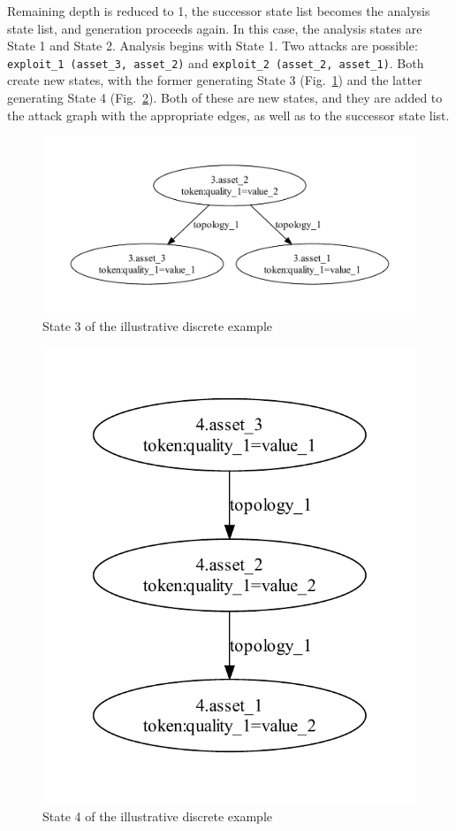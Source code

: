 Remaining depth is reduced to 1, the successor state list becomes the
analysis state list, and generation proceeds again. In this case, the
analysis states are State 1 and State 2. Analysis begins with State 1. 
Two attacks are possible: \texttt{exploit\_1 (asset\_3, asset\_2)} and
\texttt{exploit\_2 (asset\_2, asset\_1)}. Both create new states, with the
former generating State 3 (Fig.~\ref{fig:ill_topology_3}) and the latter
generating State 4 (Fig.~\ref{fig:ill_topology_4}). Both of these are new
states, and they are added to the attack graph with the appropriate edges, as
well as to the successor state list.

\begin{figure}
\centering
\includegraphics[width=\textwidth]{ag_illustrative_simple/nm_state3}
\caption{State 3 of the illustrative discrete example}
\label{fig:ill_topology_3}
\end{figure}

\begin{figure}
\centering
\includegraphics[height=0.4\textheight]{ag_illustrative_simple/nm_state4}
\caption{State 4 of the illustrative discrete example}
\label{fig:ill_topology_4}
\end{figure}

